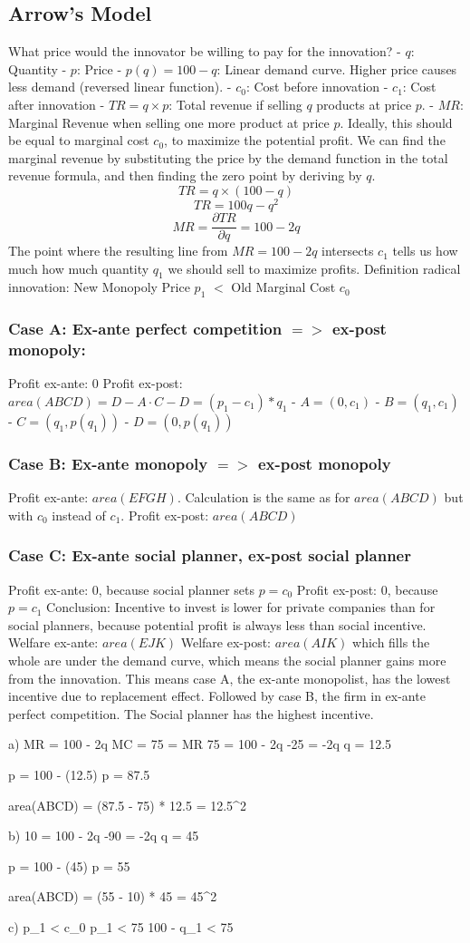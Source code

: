 \documentclass{scrartcl}
\begin{document}
\subsection*{Arrow's Model}
What price would the innovator be willing to pay for the innovation?
- $q$: Quantity
- $p$: Price
- $p(q) = 100 - q$: Linear demand curve. Higher price causes less demand (reversed linear function).
- $c_0$: Cost before innovation
- $c_1$: Cost after innovation
- $TR = q \times p$: Total revenue if selling $q$ products at price $p$.
- $MR$: Marginal Revenue when selling one more product at price $p$. Ideally, this should be equal to marginal cost $c_0$, to maximize the potential profit. We can find the marginal revenue by substituting the price by the demand function in the total revenue formula, and then finding the zero point by deriving by $q$.
$$TR = q \times (100 - q)$$
$$TR = 100q - q^2$$
$$MR = \frac{\partial TR}{\partial q} = 100 - 2q$$
The point where the resulting line from $MR = 100 - 2q$ intersects $c_1$ tells us how much how much quantity $q_1$ we should sell to maximize profits.
Definition radical innovation:
New Monopoly Price $p_1$ $<$ Old Marginal Cost $c_0$
\subsubsection*{Case A: Ex-ante perfect competition $=>$ ex-post monopoly:}
Profit ex-ante: $0$
Profit ex-post: $area(ABCD) = D - A \cdot C - D = (p_1 - c_1) * q_1$
- $A = (0, c_1)$
- $B = (q_1, c_1)$
- $C = (q_1, p(q_1))$
- $D = (0, p(q_1))$
\subsubsection*{Case B: Ex-ante monopoly $=>$ ex-post monopoly}
Profit ex-ante: $area(EFGH)$. Calculation is the same as for $area(ABCD)$ but with $c_0$ instead of $c_1$.
Profit ex-post: $area(ABCD)$
\subsubsection*{Case C: Ex-ante social planner, ex-post social planner}
Profit ex-ante: $0$, because social planner sets $p = c_0$
Profit ex-post: $0$, because $p = c_1$
Conclusion: Incentive to invest is lower for private companies than for social planners, because potential profit is always less than social incentive.
Welfare ex-ante: $area(EJK)$
Welfare ex-post: $area(AIK)$
which fills the whole are under the demand curve, which means the social planner gains more from the innovation.
This means case A, the ex-ante monopolist, has the lowest incentive due to replacement effect. Followed by case B, the firm in ex-ante perfect competition. The Social planner has the highest incentive.


a)
MR = 100 - 2q
MC = 75 = MR
75 = 100 - 2q
-25 = -2q
q = 12.5

p = 100 - (12.5)
p = 87.5

area(ABCD) = (87.5 - 75) * 12.5 = 12.5^2

b)
10 = 100 - 2q
-90 = -2q
q = 45

p = 100 - (45)
p = 55

area(ABCD) = (55 - 10) * 45 = 45^2

c)
p_1 < c_0
p_1 < 75
100 - q_1 < 75
\end{document}
